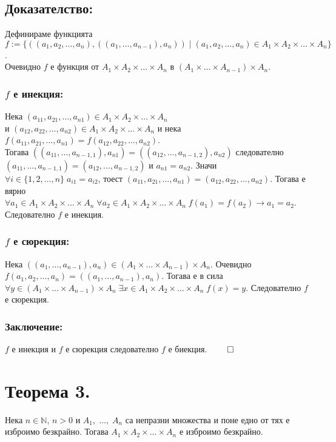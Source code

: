 \documentclass[a4paper, 12pt, oneside]{article}
\newcommand{\N}{\mathbb{N}}
\begin{document}
\subsection*{Доказателство:}
Дефинираме функцията \\
\(f := \{((a_1, a_2, \dots, a_n), ((a_1, \dots, a_{n - 1}), a_n)) \; | \; (a_1, a_2, \dots, a_n) \in A_1 \times A_2 \times \dots \times A_n\}\). \\
Очевидно \(f\) е функция от \(A_1 \times A_2 \times \dots \times A_n\) в \((A_1 \times \dots \times A_{n - 1}) \times A_n\).
\subsubsection*{\(f\) е инекция:}
Нека \((a_{11}, a_{21}, \dots, a_{n1}) \in A_1 \times A_2 \times \dots \times A_n\) \\
и \((a_{12}, a_{22}, \dots, a_{n2}) \in A_1 \times A_2 \times \dots \times A_n\)
и нека \(f(a_{11}, a_{21}, \dots, a_{n1}) = f(a_{12}, a_{22}, \dots, a_{n2})\). \\
Тогава \(((a_{11}, \dots, a_{n - 1,1}), a_{n1}) = ((a_{12}, \dots, a_{n - 1,2}), a_{n2})\)
следователно \((a_{11}, \dots, a_{n - 1,1}) = (a_{12}, \dots, a_{n - 1,2})\) и \(a_{n1} = a_{n2}\).
Значи \(\forall i \in \{1, 2, \dots, n\} \; a_{i1} = a_{i2}\),
тоест \((a_{11}, a_{21}, \dots, a_{n1}) = (a_{12}, a_{22}, \dots, a_{n2})\).
Тогава е вярно \\
\(\forall a_1 \in A_1 \times A_2 \times \dots \times A_n \; \forall a_2 \in A_1 \times A_2 \times \dots \times A_n \; f(a_1) = f(a_2) \longrightarrow a_1 = a_2\).
Следователно \(f\) е инекция.
\subsubsection*{\(f\) е сюрекция:}
Нека \(((a_1, \dots, a_{n - 1}), a_n) \in (A_1 \times \dots \times A_{n - 1}) \times A_n\).
Очевидно \(f(a_1, a_2, \dots, a_n) = ((a_1, \dots, a_{n - 1}), a_n)\). Тогава е в сила \\
\(\forall y \in (A_1 \times \dots \times A_{n - 1}) \times A_n \; \exists x \in A_1 \times A_2 \times \dots \times A_n \; f(x) = y\).
Следователно \(f\) е сюрекция.
\subsubsection*{Заключение:}
\(f\) е инекция и \(f\) е сюрекция следователно \(f\) е биекция. \(\qed\)
\section*{Теорема 3.}
Нека \(n \in \N\), \(n > 0\) и \(A_1, \; \dots, \; A_n\)
са непразни множества и поне едно от тях е изброимо безкрайно.
Тогава \(A_1 \times A_2 \times \dots \times A_n\) е изброимо безкрайно.
\end{document}
